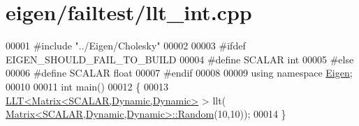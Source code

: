 \hypertarget{eigen_2failtest_2llt__int_8cpp_source}{}\section{eigen/failtest/llt\+\_\+int.cpp}
\label{eigen_2failtest_2llt__int_8cpp_source}

\begin{DoxyCode}
00001 \textcolor{preprocessor}{#include "../Eigen/Cholesky"}
00002 
00003 \textcolor{preprocessor}{#ifdef EIGEN\_SHOULD\_FAIL\_TO\_BUILD}
00004 \textcolor{preprocessor}{#define SCALAR int}
00005 \textcolor{preprocessor}{#else}
00006 \textcolor{preprocessor}{#define SCALAR float}
00007 \textcolor{preprocessor}{#endif}
00008 
00009 \textcolor{keyword}{using namespace }\hyperlink{namespace_eigen}{Eigen};
00010 
00011 \textcolor{keywordtype}{int} main()
00012 \{
00013   \hyperlink{group___cholesky___module_class_eigen_1_1_l_l_t}{LLT<Matrix<SCALAR,Dynamic,Dynamic>} > llt(
      \hyperlink{group___core___module_class_eigen_1_1_matrix}{Matrix<SCALAR,Dynamic,Dynamic>::Random}(10,10));
00014 \}
\end{DoxyCode}
